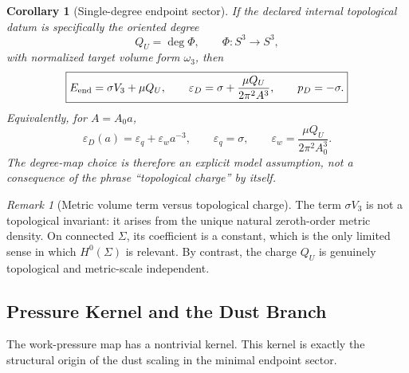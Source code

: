 \documentclass[11pt,a4paper]{article}
\def\QU{Q_U}%
\numberwithin{equation}{section}
\theoremstyle{definition}
\theoremstyle{plain}
\newtheorem{corollary}[criterion]{Corollary}
\theoremstyle{remark}
\newtheorem{remark}[criterion]{Remark}
\newcommand{\epsD}{\varepsilon_D}
\newcommand{\pD}{p_D}
\newcommand{\QU}{Q_U}
\begin{document}
\begin{corollary}[Single-degree endpoint sector]
If the declared internal topological datum is specifically the oriented degree
\begin{equation}
\QU=\deg\Phi,
\qquad
\Phi:S^3\to S^3,
\end{equation}
with normalized target volume form \(\omega_3\), then
\begin{equation}
\boxed{
E_{\rm end}=\sigma V_3+\mu\QU,
\qquad
\epsD=\sigma+\frac{\mu\QU}{2\pi^2A^3},
\qquad
\pD=-\sigma.
}
\end{equation}
Equivalently, for \(A=A_0a\),
\begin{equation}
\epsD(a)=\varepsilon_q+\varepsilon_w a^{-3},
\qquad
\varepsilon_q=\sigma,
\qquad
\varepsilon_w=\frac{\mu\QU}{2\pi^2A_0^3}.
\end{equation}
The degree-map choice is therefore an explicit model assumption, not a consequence of the phrase ``topological charge'' by itself.
\end{corollary}

\begin{remark}[Metric volume term versus topological charge]
The term \(\sigma V_3\) is not a topological invariant: it arises from the unique natural zeroth-order metric density. On connected \(\Sigma\), its coefficient is a constant, which is the only limited sense in which \(H^0(\Sigma)\) is relevant. By contrast, the charge \(\QU\) is genuinely topological and metric-scale independent.
\end{remark}

\subsection{Pressure Kernel and the Dust Branch}
The work-pressure map has a nontrivial kernel. This kernel is exactly the structural origin of the dust scaling in the minimal endpoint sector.
\end{document}
